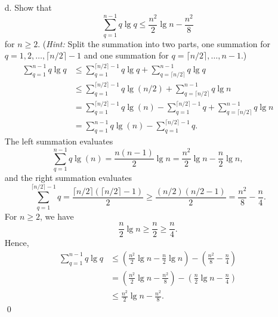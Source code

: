 \documentclass[12pt,reqno]{amsart}
\newif\ifanswer
\begin{document}
\begin{enumerate}[1.]
\begin{enumerate}
    \item[d.] Show that
    \begin{equation}
        \sum_{q = 1}^{n - 1}{q\lg{q}} \leq \frac{n^2}{2}\lg{n} - \frac{n^2}{8}
        \tag{7.4}
        \label{Equation 3 used in Problem 3}
    \end{equation}
    for $n \geq 2$. (\textit{Hint:} Split the summation into two parts, one summation for $q = 1, 2, \dots, \lceil n/2 \rceil - 1$ and one summation for $q = \lceil n/2 \rceil, \dots, n - 1$.)
    \ifanswer
    \noindent {\bf \\Solution}
    \begin{align*}
    \sum_{q = 1}^{n - 1}{q\lg{q}} &\leq \sum_{q = 1}^{\lceil n/2 \rceil - 1}{q\lg{q}} + \sum_{q = \lceil n/2 \rceil}^{n - 1}{q\lg{q}}\\
    &\leq \sum_{q = 1}^{\lceil n/2 \rceil - 1}{q\lg{(n/2)}} + \sum_{q = \lceil n/2 \rceil}^{n - 1}{q\lg{n}}\\
    &= \sum_{q = 1}^{\lceil n/2 \rceil - 1}{q\lg{(n)}} - \sum_{q = 1}^{\lceil n/2 \rceil - 1}{q} + \sum_{q = \lceil n/2 \rceil}^{n - 1}{q\lg{n}}\\
    &= \sum_{q = 1}^{n - 1}{q\lg{(n)}} - \sum_{q = 1}^{\lceil n/2 \rceil - 1}{q}.
    \end{align*}
    The left summation evaluates
    $$
    \sum_{q = 1}^{n - 1}{q\lg{(n)}} = \frac{n(n - 1)}{2}\lg{n} = \frac{n^2}{2}\lg{n} - \frac{n}{2}\lg{n},
    $$
    and the right summation evaluates
    $$
    \sum_{q = 1}^{\lceil n/2 \rceil - 1}{q} = \frac{\lceil n/2 \rceil(\lceil n/2 \rceil - 1)}{2} \geq \frac{(n/2)(n/2 - 1)}{2} = \frac{n^2}{8} - \frac{n}{4}.
    $$
    For $n\geq 2$, we have
    $$
    \frac{n}{2}\lg{n} \geq \frac{n}{2} \geq \frac{n}{4}.
    $$
    Hence,
    \begin{align*}
    \sum_{q = 1}^{n - 1}{q\lg{q}} &\leq \left(\frac{n^2}{2}\lg{n} - \frac{n}{2}\lg{n}\right) - \left(\frac{n^2}{8} - \frac{n}{4}\right)\\
    &= \left(\frac{n^2}{2}\lg{n} - \frac{n^2}{8}\right) - \left(\frac{n}{2}\lg{n} - \frac{n}{4}\right)\\
    &\leq \frac{n^2}{2}\lg{n} - \frac{n^2}{8}.
    \end{align*}
    \qed


\end{enumerate}
\end{enumerate}
\end{document}
